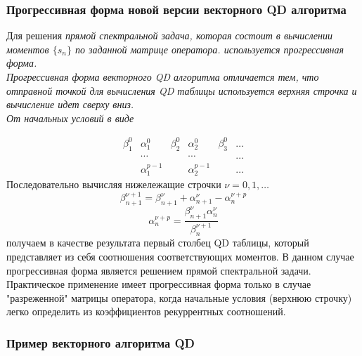 \subsubsection{Прогрессивная форма новой версии векторного QD алгоритма}

Для решения \it прямой спектральной задача, \rm которая состоит в
вычислении моментов $\{s_n\}$ по заданной матрице оператора.
используется \it прогрессивная форма. \rm \\
Прогрессивная форма векторного QD алгоритма отличается тем, что
отправной точкой для вычисления QD таблицы используется верхняя
строчка и вычисление идет сверху вниз. \\ От начальных условий в
виде

\begin{equation}
\begin{array}{ccccccccccccccccc}
\beta_1^0 & \alpha_1^0 & \beta_2^0 & \alpha_2^0 & \beta_3^0 &
\ldots \\
 & \cdots &  & \cdots &  &
\ldots \\
 & \alpha_1^{p-1} &  & \alpha_2^{p-1} &  &
\ldots
\end{array}
\end{equation}
Последовательно вычисляя нижележащие строчки $\nu =0, 1, \ldots $
$$\beta_{n+1}^{\nu+1}=\beta_{n+1}^{\nu}+\alpha_{n+1}^{\nu}-\alpha_{n}^{\nu+p}$$
$$\alpha_{n}^{\nu+p}=\displaystyle\frac{\beta_{n+1}^{\nu}\alpha_{n}^{\nu}} {\beta_{n}^{\nu+1}}$$
получаем в качестве результата первый столбец QD таблицы, который
представляет из себя соотношения соответствующих моментов. В
данном случае прогрессивная форма является решением прямой
спектральной задачи. \\
Практическое применение имеет прогрессивная
форма только в случае "разреженной" матрицы оператора, когда
начальные условия (верхнюю строчку) легко определить из
коэффициентов рекуррентных соотношений.



\subsubsection{Пример векторного алгоритма QD}

